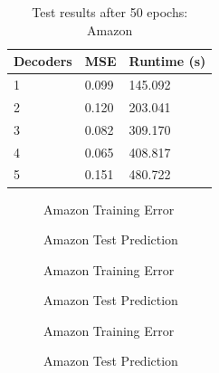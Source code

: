 \documentclass{article}
\begin{document}
    \begin{table}[H]
      \caption{Test results after 50 epochs: Amazon}
      \centering
      \begin{tabular}{lll}
        \toprule
        Decoders     & MSE     & Runtime (s) \\
        \midrule
	 1 & 0.099 & 145.092 \\
	 2 & 0.120 & 203.041 \\
	 3 & 0.082 & 309.170 \\
	 4 & 0.065 & 408.817 \\
	 5 & 0.151 & 480.722 \\
      \bottomrule
      \end{tabular}
    \end{table}
    \begin{figure}[H]
      \centering
      \begin{minipage}[b]{0.4	\textwidth}
        \caption{Amazon Training Error}
      \end{minipage}
      \hfill
      \begin{minipage}[b]{0.4	\textwidth}
        \caption{Amazon Test Prediction}
      \end{minipage}
    \end{figure}
    \begin{figure}[H]
      \centering
      \begin{minipage}[b]{0.4	\textwidth}
        \caption{Amazon Training Error}
      \end{minipage}
      \hfill
      \begin{minipage}[b]{0.4	\textwidth}
        \caption{Amazon Test Prediction}
      \end{minipage}
    \end{figure}
    \begin{figure}[H]
      \centering
      \begin{minipage}[b]{0.4	\textwidth}
        \caption{Amazon Training Error}
      \end{minipage}
      \hfill
      \begin{minipage}[b]{0.4	\textwidth}
        \caption{Amazon Test Prediction}
      \end{minipage}
    \end{figure}
\end{document}
